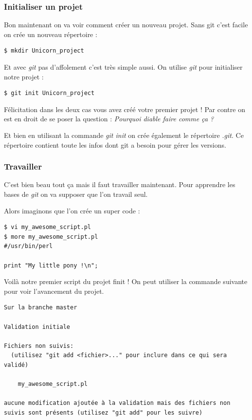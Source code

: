 \documentclass[12pt,a4paper]{article}
\begin{document}
\subsubsection{Initialiser un projet}

Bon maintenant on va voir comment créer un nouveau projet. Sans git c'est facile on crée un nouveau répertoire :

\begin{verbatim}
$ mkdir Unicorn_project
\end{verbatim}

Et avec \emph{git} pas d'affolement c'est très simple aussi. On utilise \emph{git} pour initialiser notre projet :

\begin{verbatim}
$ git init Unicorn_project
\end{verbatim}

Félicitation dans les deux cas vous avez créé votre premier projet ! Par contre on est en droit de se poser la question : \emph{Pourquoi diable faire comme ça ?}

Et bien en utilisant la commande \emph{git init} on crée également le répertoire \emph{.git}. Ce répertoire contient toute les infos dont git a besoin pour gérer les versions.

\subsubsection{Travailler}

C'est bien beau tout ça mais il faut travailler maintenant. Pour apprendre les bases de \emph{git} on va supposer que l'on travail seul.

Alors imaginons que l'on crée un super code :
\begin{verbatim}
$ vi my_awesome_script.pl
$ more my_awesome_script.pl
#/usr/bin/perl

print "My little pony !\n";
\end{verbatim}

Voilà notre premier script du projet finit ! On peut utiliser la commande suivante pour voir l'avancement du projet.

\begin{verbatim}
Sur la branche master

Validation initiale

Fichiers non suivis:
  (utilisez "git add <fichier>..." pour inclure dans ce qui sera
validé)

	my_awesome_script.pl

aucune modification ajoutée à la validation mais des fichiers non
suivis sont présents (utilisez "git add" pour les suivre)
\end{verbatim}
\end{document}

